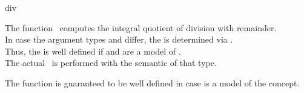 \begin{ccRefFunction}{div}

\ccDefinition

The function \ccRefName\ computes the integral quotient of division 
with remainder.\\ 

In case the argument types  and  differ, 
the  is determined via .\\
Thus, the  is well defined if  and  
are a model of . \\
The actual \ccRefName\ is performed with the semantic of that type.

The function is guaranteed to be well defined in case 
is a model of the  concept. 



\ccSeeAlso

\\
\\
\\
\\

\end{ccRefFunction}

